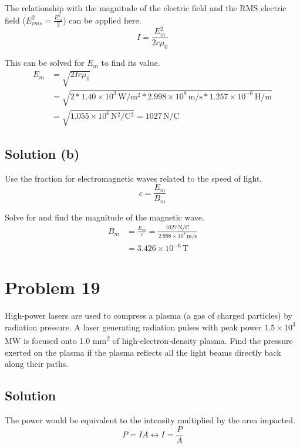 \documentclass[12pt]{article}
\newcommand{\E}[1]{\times 10^{#1}}
\begin{document}
            The relationship with the magnitude of the electric field and the RMS electric field ($E_{rms}^2 = \frac{E_m^2}{2}$) can be applied here.
            \begin{equation}
                I = \frac{E_m^2}{2c\mu_0}
            \end{equation}

            This can be solved for $E_m$ to find its value.
            \begin{align}
                E_m &=  \sqrt{2Ic\mu_0}\\
                    &=  \sqrt{2 * 1.40\E{3}\,\unit{\watt/\meter^2} * 2.998\E{8}\,\unit{\meter/\second} * 1.257\E{-6}\,\unit{\henry/\meter}}\\
                    &=  \sqrt{1.055\E{6}\,\unit{\newton^2/\coulomb^2}}
                    =   \boxed{1027\,\unit{\newton/\coulomb}}
            \end{align}

        \subsection{Solution (b)}
            Use the fraction for electromagnetic waves related to the speed of light.
            \begin{equation}
                c   =   \frac{E_m}{B_m}
            \end{equation}

            Solve for and find the magnitude of the magnetic wave.
            \begin{align}
                B_m &=  \frac{E_m}{c}
                    =   \frac{1027\,\unit{\newton/\coulomb}}{2.998\E{8}\,\unit{\meter/\second}}\\
                    &=  \boxed{3.426\E{-6}\,\unit{\tesla}}
            \end{align}

    \pagebreak
    \section{Problem 19}
        High-power lasers are used to compress a plasma (a gas of charged particles) by radiation pressure. 
        A laser generating radiation pulses with peak power $1.5\E{3}$ MW is focused onto 1.0 \unit{\milli\meter^2} of high-electron-density plasma. 
        Find the pressure exerted on the plasma if the plasma reflects all the light beams directly back along their paths.

        \subsection{Solution}
            The power would be equivalent to the intensity multiplied by the area impacted.
            \begin{equation}
                P = IA \leftrightarrow I = \frac{P}{A}
            \end{equation}
\end{document}

